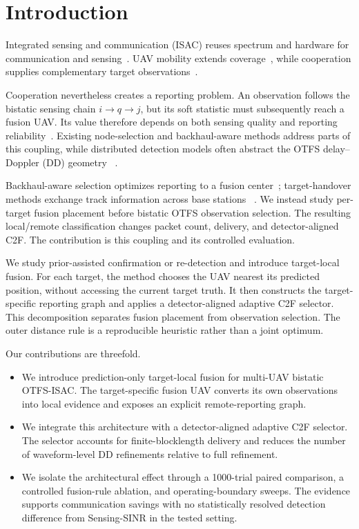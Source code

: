 \section{Introduction}
\label{sec:introduction}

Integrated sensing and communication (ISAC) reuses spectrum and hardware
for communication and sensing~\cite{liu_dual_functional_6g,gonzalez_revolution_2024}.
UAV mobility extends coverage~\cite{mu_uav_isac,meng_uav_isac_challenges},
while cooperation supplies complementary target observations~\cite{meng_cooperative_isac_2025}.

Cooperation nevertheless creates a reporting problem. An observation follows
the bistatic sensing chain $i\!\rightarrow\!q\!\rightarrow\!j$, but its soft
statistic must subsequently reach a fusion UAV. Its value therefore depends on
both sensing quality and reporting reliability~\cite{yuan_dd_isac,
keskin_mimo_otfs_isac,chen_node_selection_backhaul_2025}. Existing node-selection
and backhaul-aware methods address parts of this coupling, while distributed
detection models often abstract the OTFS delay--Doppler (DD) geometry
~\cite{chawla_massive_mimo_dd,chawla_parameter_detection_mimo_wsn,
meng_network_level_isac_2024}.

Backhaul-aware selection optimizes reporting to a fusion center~\cite{chen_node_selection_backhaul_2025};
target-handover methods exchange track information across base stations
~\cite{ge_handover,bai_handover}. We instead study per-target fusion placement
before bistatic OTFS observation selection. The resulting local/remote
classification changes packet count, delivery, and detector-aligned C2F.
The contribution is this coupling and its controlled evaluation.

We study prior-assisted confirmation or re-detection and introduce target-local
fusion. For each target, the method chooses the UAV nearest its predicted
position, without accessing the current target truth. It then constructs the
target-specific reporting graph and applies a detector-aligned adaptive C2F
selector. This decomposition separates fusion placement from observation
selection. The outer distance rule is a reproducible heuristic rather than a
joint optimum.

Our contributions are threefold.
\begin{itemize}
	\item We introduce prediction-only target-local fusion for multi-UAV bistatic
	OTFS-ISAC. The target-specific fusion UAV converts its own observations into
	local evidence and exposes an explicit remote-reporting graph.

	\item We integrate this architecture with a detector-aligned adaptive C2F
	selector. The selector accounts for finite-blocklength delivery and reduces
	the number of waveform-level DD refinements relative to full refinement.

	\item We isolate the architectural effect through a 1000-trial paired comparison,
	a controlled fusion-rule ablation, and operating-boundary sweeps. The evidence
	supports communication savings with no statistically resolved detection
	difference from Sensing-SINR in the tested setting.
\end{itemize}
